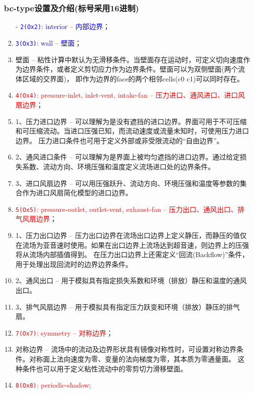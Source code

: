 \documentclass[lang=cn,11pt,a4paper]{elegantpaper} %
\begin{document}
\subsubsection{bc-type设置及介绍(标号采用16进制)}\label{bc-type}
\begin{enumerate}
  \item[-] \textcolor{blue}{\lstinline{2(Ox2)}: interior -- 内部边界}；
  \item[-] \textcolor{blue}{\lstinline{3(Ox3)}: wall -- 壁面}；
  \item[] 壁面 -- 粘性计算中默认为无滑移条件。当壁面存在运动时，可定义切向速度作为边界条件，或者定义剪切应力作为边界条件。壁面可以为双侧壁面(两个流体区域的交界面)，
  即作为边界的face的两个相邻cells(c0 c1)可以同时存在。
  \item[-] \textcolor{red}{\lstinline{4(Ox4)}: pressure-inlet, inlet-vent, intake-fan -- 压力进口、通风进口、进口风扇边界}；
  \item[] 1、压力进口边界 -- 可以理解为是没有遮挡的进口边界。界面可用于不可压缩和可压缩流动。当进口压强已知，而流动速度或流量未知时，可使用压力进口边界。
  压力进口条件也可用于定义外部或非受限流动的“自由边界”。
  \item[] 2、通风进口条件 -- 可以理解为是界面上被均匀遮挡的进口边界。通过给定损失系数、流动方向、环境压强和温度定义流场进口处的边界条件。
  \item[] 3、进口风扇边界 -- 可以用压强跃升、流动方向、环境压强和温度等参数的集合作为进口风扇简化模型的进口边界。
  \item[-] \textcolor{red}{\lstinline{5(Ox5)}: pressure-outlet, outlet-vent, exhaust-fan -- 压力出口、通风出口、排气风扇边界}；
  \item[] 1、压力出口边界 -- 压力出口边界在流场出口边界上定义静压，而静压的值仅在流场为亚音速时使用。如果在出口边界上流场达到超音速，则边界上的压强将从流场内部插值得到。
  在压力出口边界上还需定义“回流(Backflow)”条件，用于处理出现回流时的边界边界条件。
  \item[] 2、通风出口 -- 用于模拟具有指定损失系数和环境（排放）静压和温度的通风出口。
  \item[] 3、排气风扇边界 -- 用于模拟具有指定压力跃变和环境（排放）静压的排气扇。
  \item[-] \textcolor{red}{\lstinline{7(Ox7)}: symmetry -- 对称边界}；
  \item[] 对称边界 -- 流场中的流动及边界形状具有镜像对称性时，可设置对称边界条件。对称面上法向速度为零、变量的法向梯度为零，其本质为零通量面。
  这种条件也可以用于定义粘性流动中的零剪切力滑移壁面。
  \item[-] \textcolor{red}{\lstinline{8(Ox8)}: periodic-shadow};

\end{enumerate}
\end{document}
